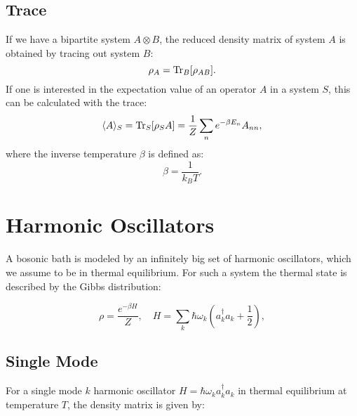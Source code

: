 
\subsection{Trace}
If we have a bipartite system \( A \otimes B \), the reduced density matrix of system \( A \) is obtained by tracing out system \( B \):
\begin{equation} \label{eq:partial_trace}
\rho_A = \mathrm{Tr}_B[\rho_{AB}].
\end{equation}
If one is interested in the expectation value of an operator \( A \) in a system \( S \), this can be calculated with the trace:
\begin{equation} \label{eq:expectation_value}
\langle A \rangle_S = \mathrm{Tr}_S[\rho_S A] = \frac{1}{Z} \sum_n e^{-\beta E_n} A_{nn},
\end{equation}
where the inverse temperature \(\beta\) is defined as:
\begin{equation} \label{eq:beta_definition}
\beta = \frac{1}{k_B T}.
\end{equation}


\section{Harmonic Oscillators}
A bosonic bath is modeled by an infinitely big set of harmonic oscillators, which we assume to be in thermal equilibrium.
For such a system the thermal state is described by the Gibbs distribution:

\begin{equation} \label{eq:gibbs_state}
\rho = \frac{e^{-\beta H}}{Z}, \quad H = \sum_k \hbar \omega_k \left(a_k^{\dagger} a_k + \frac{1}{2}\right),
\end{equation}

\subsection{Single Mode}
For a single mode \( k \) harmonic oscillator \( H = \hbar \omega_k a_k^{\dagger} a_k \) in thermal equilibrium at temperature \( T \), the density matrix is given by:

